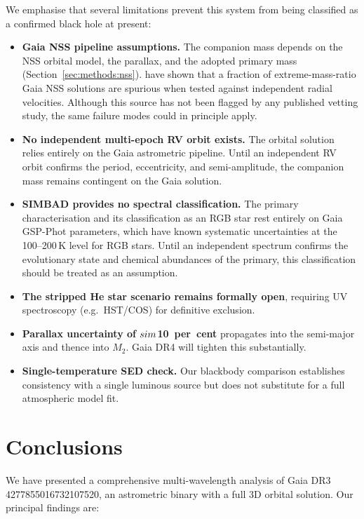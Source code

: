 \documentclass[usenatbib,fleqn]{mnras}
\begin{document}
We emphasise that several limitations prevent this system from being
classified as a confirmed black hole at present:
\begin{itemize}
\item \textbf{Gaia NSS pipeline assumptions.}  The companion mass
  depends on the NSS orbital model, the parallax, and the
  adopted primary mass (Section~\ref{sec:methods:nss}).
  \citet{ElBadry2024} have shown that a fraction of extreme-mass-ratio
  Gaia NSS solutions are spurious when tested against independent
  radial velocities.  Although this source has not been flagged by
  any published vetting study, the same failure modes could in
  principle apply.
\item \textbf{No independent multi-epoch RV orbit exists.}  The
  orbital solution relies entirely on the Gaia astrometric pipeline.
  Until an independent RV orbit confirms the period, eccentricity,
  and semi-amplitude, the companion mass remains contingent on the
  Gaia solution.
\item \textbf{SIMBAD provides no spectral classification.}  The
  primary characterisation and its classification as an RGB star
  rest entirely on Gaia GSP-Phot parameters,
  which have known systematic uncertainties at the 100--200\,K
  level for RGB stars.  Until an independent spectrum confirms
  the evolutionary state and chemical abundances of the primary,
  this classification should be treated as an assumption.
\item \textbf{The stripped He star scenario remains formally open},
  requiring UV spectroscopy (e.g.\ HST/COS) for definitive
  exclusion.
\item \textbf{Parallax uncertainty of $\\sim$10~per~cent} propagates
  into the semi-major axis and thence into $M_2$.  Gaia DR4 will
  tighten this substantially.
\item \textbf{Single-temperature SED check.}  Our blackbody
  comparison establishes consistency with a single luminous source
  but does not substitute for a full atmospheric model fit.
\end{itemize}

\section{Conclusions}
\label{sec:conclusions}

We have presented a comprehensive multi-wavelength analysis of
Gaia DR3 4277855016732107520, an astrometric binary with a full
3D orbital solution.  Our principal findings are:
\end{document}
